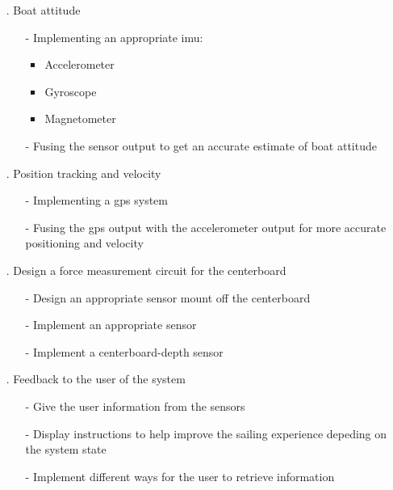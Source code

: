 \begin{itemize}
	\item[.] Boat attitude
	\begin{itemize}
		\item[-] Implementing an appropriate \gls{imu}:
		\begin{itemize}
			\item Accelerometer
			\item Gyroscope
			\item Magnetometer
		\end{itemize}
		\item[-] Fusing the sensor output to get an accurate estimate of boat attitude
	\end{itemize}
	\item[.] Position tracking and velocity
	\begin{itemize}
		\item[-] Implementing a \gls{gps} system
		\item[-] Fusing the \gls{gps} output with the accelerometer output for more accurate positioning and velocity
	\end{itemize}
	\item[.] Design a force measurement circuit for the centerboard
	\begin{itemize}
		\item[-] Design an appropriate sensor mount off the centerboard
		\item[-] Implement an appropriate sensor
		\item[-] Implement a centerboard-depth sensor
	\end{itemize}
	\item[.] Feedback to the user of the system
	\begin{itemize}
		\item[-] Give the user information from the sensors
		\item[-] Display instructions to help improve the sailing experience depeding on the system state
		\item[-] Implement different ways for the user to retrieve information
	\end{itemize}
\end{itemize}

